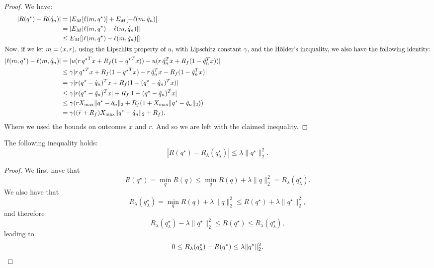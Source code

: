 \begin{proof}
We have:
\begin{align*}
  |R({q^\star}) - R({\hat q}_n)| &= |E_M[\ell(m,{q^\star})] + E_M[-\ell(m,{\hat q}_n)]\\
                                           & = |E_M[\ell(m,{q^\star}) - \ell(m,{\hat q}_n)]|\\
                                           & \leq E_M[|\ell(m,{q^\star}) - \ell(m,{\hat q}_n)|].\\
  \intertext{Now, if we let $m=(x,r)$, using the Lipschitz property of $u$, with Lipschitz constant 
  $\gamma$, and the Hölder's inequality, we also have the following identity:}
  |\ell(m,{q^\star}) - \ell(m,{\hat q}_n)| &= |u(r\,{q^\star}^Tx + R_f(1-{q^\star}^{T}x)) - u(r\,{\hat q}_n^Tx + R_f(1-{\hat q}_n^{T}x))| \\
                                           & \leq \gamma|r\,{q^\star}^Tx + R_f(1-{q^\star}^Tx) - r\,{\hat q}_n^Tx - R_f(1-{\hat q}_n^Tx)|\\
                                           & = \gamma|r({q^\star}-{\hat q}_n)^Tx + R_f(1-({q^\star}-{\hat q}_n)^Tx)|\\
                                           & \leq \gamma|r({q^\star}-{\hat q}_n)^Tx| + R_f|1-({q^\star}-{\hat q}_n)^Tx|\\
                                           & \leq \gamma(\bar rX_{\max} \|{q^\star}-{\hat q}_n\|_2 + R_f(1+X_{\max} \|{q^\star}-{\hat q}_n\|_2))\\
                                           & = \gamma((\bar r + R_f)X_{\max} \|{q^\star} - {\hat q}_n\|_2 + R_f).
\end{align*}
Where we used the bounds on outcomes $x$ and $r$. And so we are left with the claimed
inequality. 
\end{proof}

\begin{claim}
  \label{delage_bound_claim}
  The following inequality holds:
  \begin{equation*}
    |R(q^\star) - R_\lambda(q^\star_\lambda)| \leq \lambda\|q^\star\|^2_2.
  \end{equation*}
\end{claim}
\begin{proof}
  We first have that
  \begin{equation*}
    R(q^\star) = \min_q R(q) \leq \min_q R(q) + \lambda\|q\|_2^2 = R_\lambda(q^\star_\lambda).
  \end{equation*}
  We also have that
  \begin{equation*}
    R_\lambda(q^\star_\lambda) = \min_q R(q) + \lambda\|q\|^2_2 \leq R(q^\star) + \lambda\|q^\star\|^2_2,
  \end{equation*}
  and therefore
  \begin{equation*}
    R_\lambda(q^\star_\lambda) - \lambda\|q^\star\|^2_2 \leq R(q^\star) \leq R_\lambda(q^\star_\lambda),
  \end{equation*}
  leading to
  \begin{equation*}
    0 \leq R_\lambda(q^\star_\lambda) - R(q^\star) \leq \lambda\|q^\star\|^2_2.\qedhere
  \end{equation*}
\end{proof}

